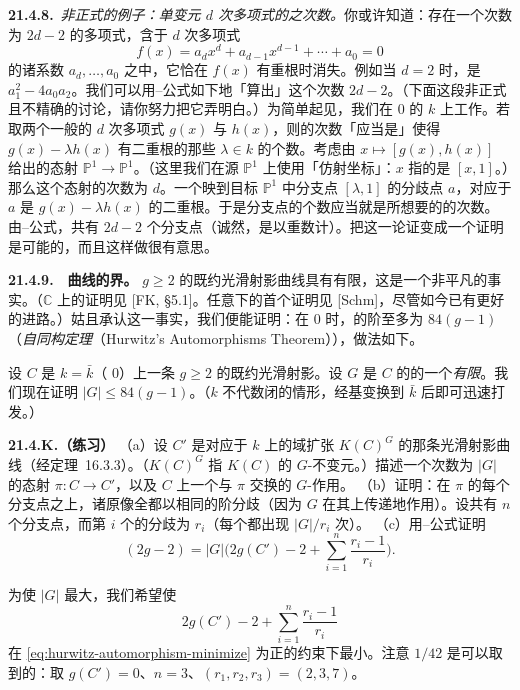 \textbf{21.4.8.}\ \emph{非正式的例子：单变元 $d$ 次多项式的\trDiscriminant{}之次数。}\quad 你或许知道：存在一个次数为 $2d-2$ 的多项式，含于 $d$ 次多项式
\[
f(x)=a_dx^d+a_{d-1}x^{d-1}+\cdots+a_0=0
\]
的诸系数 $a_d,\dots,a_0$ 之中，它恰在 $f(x)$ 有重根时消失。例如当 $d=2$ 时，\trDiscriminant{}是 $a_1^2-4a_0a_2$。我们可以用\trRiemann--\trHurwitz{}公式如下地「算出」这个次数 $2d-2$。（下面这段非正式且不精确的讨论，请你努力把它弄明白。）为简单起见，我们在\trCharacteristic{} $0$ 的\trAlgClosedField{} $k$ 上工作。若取两个一般的 $d$ 次多项式 $g(x)$ 与 $h(x)$，则\trDiscriminant{}的次数「应当是」使得 $g(x)-\lambda h(x)$ 有二重根的那些 $\lambda\in k$ 的个数。考虑由 $x\mapsto[g(x),h(x)]$ 给出的态射 $\mathbb{P}^1\to\mathbb{P}^1$。（这里我们在源 $\mathbb{P}^1$ 上使用「仿射坐标」：$x$ 指的是 $[x,1]$。）那么这个态射的次数为 $d$。一个映到目标 $\mathbb{P}^1$ 中分支点 $[\lambda,1]$ 的分歧点 $a$，对应于 $a$ 是 $g(x)-\lambda h(x)$ 的二重根。于是分支点的个数应当就是所想要的\trDiscriminant{}的次数。由\trRiemann--\trHurwitz{}公式，共有 $2d-2$ 个分支点（诚然，是以重数计）。把这一论证变成一个证明是可能的，而且这样做很有意思。

\textbf{21.4.9.}\ \hard\ \textbf{曲线\trAutomorphismGroup{}的界。}\quad \trGenus{} $g\ge 2$ 的既约光滑射影曲线具有有限\trAutomorphismGroup，这是一个非平凡的事实。（$\mathbb{C}$ 上的证明见 [FK, \S5.1]。任意\trCharacteristic{}下的首个证明见 [Schm]，尽管如今已有更好的进路。）姑且承认这一事实，我们便能证明：在\trCharacteristic{} $0$ 时，\trAutomorphismGroup{}的阶至多为 $84(g-1)$（\emph{\trHurwitz{}自同构定理}（Hurwitz's Automorphisms Theorem）），做法如下。

设 $C$ 是\trAlgClosedField{} $k=\bar{k}$（\trCharacteristic{} $0$）上一条\trGenus{} $g\ge 2$ 的既约光滑射影\trCurve。设 $G$ 是 $C$ 的\trAutomorphism{}的一个\emph{有限}\trGroup。我们现在证明 $|G|\le 84(g-1)$。（$k$ 不代数闭的情形，经基变换到 $\bar{k}$ 后即可迅速打发。）

\textbf{21.4.K.（练习）}\quad
（a）设 $C'$ 是对应于 $k$ 上的域扩张 $K(C)^G$ 的那条光滑射影曲线（经\mbox{定理~16.3.3}）。（$K(C)^G$ 指 $K(C)$ 的 $G$-不变元。）描述一个次数为 $|G|$ 的态射 $\pi\colon C\to C'$，以及 $C$ 上一个与 $\pi$ 交换的\trFaithful{} $G$-作用。
（b）证明：在 $\pi$ 的每个分支点之上，诸原像全都以相同的阶分歧（因为 $G$ 在其上传递地作用）。设共有 $n$ 个分支点，而第 $i$ 个的分歧为 $r_i$（每个都出现 $|G|/r_i$ 次）。
（c）用\trRiemann--\trHurwitz{}公式证明
\[
(2g-2)=|G|\biggl(2g(C')-2+\sum_{i=1}^{n}\frac{r_i-1}{r_i}\biggr).
\]

为使 $|G|$ 最大，我们希望使
\begin{equation*}\tag{21.4.9.1}\label{eq:hurwitz-automorphism-minimize}
2g(C')-2+\sum_{i=1}^{n}\frac{r_i-1}{r_i}
\end{equation*}
在 \eqref{eq:hurwitz-automorphism-minimize} 为正的约束下最小。注意 $1/42$ 是可以取到的：取 $g(C')=0$、$n=3$、$(r_1,r_2,r_3)=(2,3,7)$。

